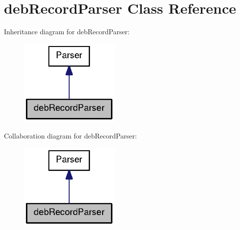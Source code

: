\section{deb\-Record\-Parser \-Class \-Reference}
\label{classdebRecordParser}


\-Inheritance diagram for deb\-Record\-Parser\-:
\nopagebreak
\begin{figure}[H]
\begin{center}
\leavevmode
\includegraphics[width=140pt]{classdebRecordParser__inherit__graph}
\end{center}
\end{figure}


\-Collaboration diagram for deb\-Record\-Parser\-:
\nopagebreak
\begin{figure}[H]
\begin{center}
\leavevmode
\includegraphics[width=140pt]{classdebRecordParser__coll__graph}
\end{center}
\end{figure}

